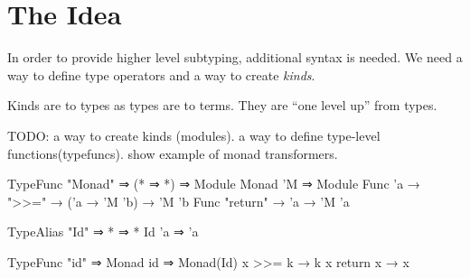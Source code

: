 \section{The Idea}
\begin{multicols}{2}
  In order to provide higher level subtyping, additional syntax is needed.
  We need a way to define type operators and a way to create \textit{kinds}.

  Kinds are to types as types are to terms.
  They are ``one level up'' from types.

  TODO:
  a way to create kinds (modules).
  a way to define type-level functions(typefuncs).
  show example of monad transformers.
  
  \begin{code}[caption=A generic monad transformer]
  TypeFunc "Monad" ⇒ (* ⇒ *) ⇒ Module
  Monad 'M ⇒ Module {
    Func 'a → ">>=" → ('a → 'M 'b) → 'M 'b
    Func "return" → 'a → 'M 'a
  }
  \end{code}

  \begin{code}[caption=the identity monad]
  TypeAlias "Id" ⇒ * ⇒ *
  Id 'a ⇒ 'a
  
  TypeFunc "id" ⇒ Monad 
  id ⇒ Monad(Id) {
    x >>= k → k x
    return x → x
  }
  \end{code}
\end{multicols}
